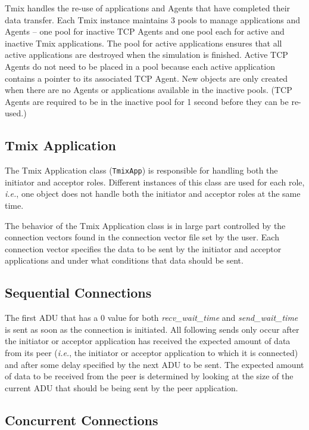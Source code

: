 Tmix handles the re-use of applications and Agents that have
completed their data transfer. Each Tmix instance maintains 3 pools to manage
applications and Agents -- one pool for inactive TCP Agents and one
pool each for active and inactive Tmix applications. The
pool for active applications ensures that all active applications are
destroyed when the simulation is finished. Active TCP Agents do not
need to be placed in a pool because each active application contains a
pointer to its associated TCP Agent. New objects are only created when
there are no Agents or applications available in the inactive pools.  (TCP 
Agents are required to be in the inactive pool for 1 second before they can 
be re-used.)

\subsection{Tmix Application}

The Tmix Application class ({\tt TmixApp}) is responsible for
handling both the initiator and acceptor roles.  Different instances
of this class are used for each role, \emph{i.e.}, one object does
not handle both the initiator and acceptor roles at the same time.

The behavior of the Tmix Application class is in large part controlled by
the connection vectors found in the connection vector file set by
the user.  Each connection vector specifies the data to be sent by the initiator
and acceptor applications and under what conditions that data should be sent.

\subsection{Sequential Connections}

The first ADU that has a 0 value for both \emph{recv\_wait\_time} and
\emph{send\_wait\_time} is sent as soon as the connection is initiated.
All following sends only occur after the initiator or acceptor
application has received the expected amount of data from its peer
(\emph{i.e.}, the initiator or acceptor application to which it is connected)
and after some delay specified by the next ADU to be sent. The
expected amount of data to be received from the peer is determined by
looking at the size of the current ADU that should be being sent by
the peer application.

\subsection{Concurrent Connections}

